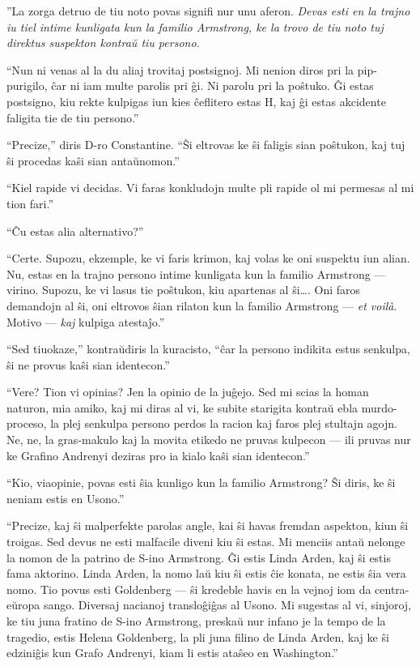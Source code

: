 ''La zorga detruo de tiu noto povas signifi nur unu aferon. \emph{Devas esti en la trajno iu tiel intime kunligata kun la familio Armstrong, ke la trovo de tiu noto tuj direktus suspekton kontraŭ tiu persono.}

``Nun ni venas al la du aliaj trovitaj postsignoj. Mi nenion diros pri la pip-purigilo, ĉar ni iam multe parolis pri ĝi. Ni parolu pri la poŝtuko. Ĝi estas postsigno, kiu rekte kulpigas iun kies ĉeflitero estas H, kaj ĝi estas akcidente faligita tie de tiu persono.''

``Precize,'' diris D-ro Constantine. ``Ŝi eltrovas ke ŝi faligis sian poŝtukon, kaj tuj ŝi procedas kaŝi sian antaŭnomon.''

``Kiel rapide vi decidas. Vi faras konkludojn multe pli rapide ol mi permesas al mi tion fari.''

``Ĉu estas alia alternativo?''

``Certe. Supozu, ekzemple, ke vi faris krimon, kaj volas ke oni suspektu iun alian. Nu, estas en la trajno persono intime kunligata kun la familio Armstrong --- virino. Supozu, ke vi lasus tie poŝtukon, kiu apartenas al ŝi{\ldots}. Oni faros demandojn al ŝi, oni eltrovos ŝian rilaton kun la familio Armstrong --- \emph{et voilà}. Motivo --- \emph{kaj} kulpiga atestaĵo.''

``Sed tiuokaze,'' kontraŭdiris la kuracisto, ``ĉar la persono indikita estus senkulpa, ŝi ne provus kaŝi sian identecon.''

``Vere? Tion vi opinias? Jen la opinio de la juĝejo. Sed mi scias la homan naturon, mia amiko, kaj mi diras al vi, ke subite starigita kontraŭ ebla murdo-proceso, la plej senkulpa persono perdos la racion kaj faros plej stultajn agojn. Ne, ne, la gras-makulo kaj la movita etikedo ne pruvas kulpecon --- ili pruvas nur ke Grafino Andrenyi deziras pro ia kialo kaŝi sian identecon.''

``Kio, viaopinie, povas esti ŝia kunligo kun la familio Armstrong? Ŝi diris, ke ŝi neniam estis en Usono.''

``Precize, kaj ŝi malperfekte parolas angle, kai ŝi havas fremdan aspekton, kiun ŝi troigas. Sed devus ne esti malfacile diveni kiu ŝi estas. Mi menciis antaŭ nelonge la nomon de la patrino de S-ino Armstrong. Ĝi estis Linda Arden, kaj ŝi estis fama aktorino. Linda Arden, la nomo laŭ kiu ŝi estis ĉie konata, ne estis ŝia vera nomo. Tio povus esti Goldenberg --- ŝi kredeble havis en la vejnoj iom da centra-eŭropa sango. Diversaj nacianoj transloĝiĝas al Usono. Mi sugestas al vi, sinjoroj, ke tiu juna fratino de S-ino Armstrong, preskaŭ nur infano je la tempo de la tragedio, estis Helena Goldenberg, la pli juna filino de Linda Arden, kaj ke ŝi edziniĝis kun Grafo Andrenyi, kiam li estis ataŝeo en Washington.''

